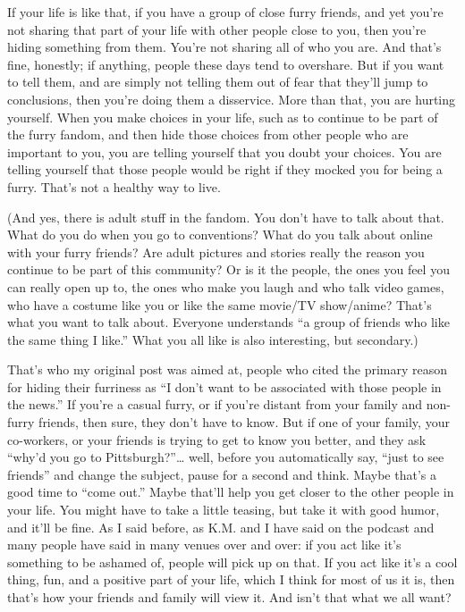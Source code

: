 If your life is like that, if you have a group of close furry friends, and yet you're not sharing that part of your life with other people close to you, then you're hiding something from them. You're not sharing all of who you are. And that's fine, honestly; if anything, people these days tend to overshare. But if you want to tell them, and are simply not telling them out of fear that they'll jump to conclusions, then you're doing them a disservice. More than that, you are hurting yourself. When you make choices in your life, such as to continue to be part of the furry fandom, and then hide those choices from other people who are important to you, you are telling yourself that you doubt your choices. You are telling yourself that those people would be right if they mocked you for being a furry. That's not a healthy way to live.

(And yes, there is adult stuff in the fandom. You don't have to talk about that. What do you do when you go to conventions? What do you talk about online with your furry friends? Are adult pictures and stories really the reason you continue to be part of this community? Or is it the people, the ones you feel you can really open up to, the ones who make you laugh and who talk video games, who have a costume like you or like the same movie/TV show/anime? That's what you want to talk about. Everyone understands ``a group of friends who like the same thing I like.'' What you all like is also interesting, but secondary.)

That's who my original post was aimed at, people who cited the primary reason for hiding their furriness as ``I don't want to be associated with those people in the news.'' If you're a casual furry, or if you're distant from your family and non-furry friends, then sure, they don't have to know. But if one of your family, your co-workers, or your friends is trying to get to know you better, and they ask ``why'd you go to Pittsburgh?''… well, before you automatically say, ``just to see friends'' and change the subject, pause for a second and think. Maybe that's a good time to ``come out.'' Maybe that'll help you get closer to the other people in your life. You might have to take a little teasing, but take it with good humor, and it'll be fine. As I said before, as K.M. and I have said on the podcast and many people have said in many venues over and over: if you act like it's something to be ashamed of, people will pick up on that. If you act like it's a cool thing, fun, and a positive part of your life, which I think for most of us it is, then that's how your friends and family will view it. And isn't that what we all want?
